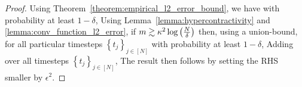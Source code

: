 \expectedsquarederror*
\begin{proof}
    Using Theorem~\ref{theorem:empirical_l2_error_bound}, we have with probability at least $1-\delta$, 
    Using Lemma~\ref{lemma:hypercontractivity} and \ref{lemma:conv_function_l2_error}, if $m \gtrsim \kappa^{2}\log\left(\frac{N}{\delta}\right)$ then, using a union-bound, for all particular timesteps $\left\{t_{j}\right\}_{j \in [N]}$ with probability at least $1-\delta$,
Adding over all timesteps $\left\{t_{j}\right\}_{j \in [N]}$, 
The result then follows by setting the RHS smaller by $\epsilon^{2}$.
\end{proof}

